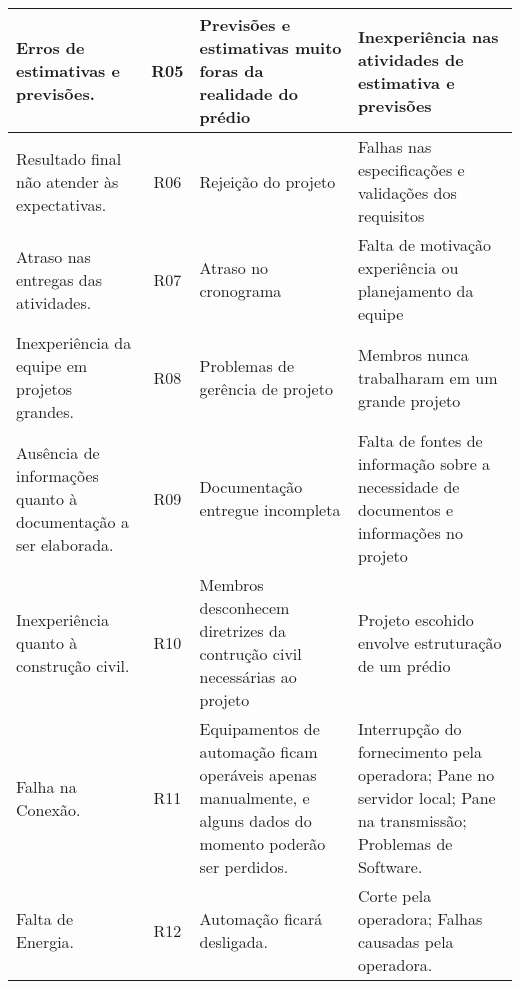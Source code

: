 \begin{table}[!h]
\begin{tabular}{|l|c|l|l|}
    \parbox[t]{5cm}{Erros de estimativas e previsões.}                              & R05                    & \parbox[t]{4cm}{Previsões e estimativas muito foras da realidade do prédio}               & \parbox[t]{4cm}{Inexperiência nas atividades de estimativa e previsões}                                   \\ \hline
    \parbox[t]{5cm}{Resultado final não atender às expectativas.}                   & R06                    & \parbox[t]{4cm}{Rejeição do projeto}                                                      & \parbox[t]{4cm}{Falhas nas especificações e validações dos requisitos}                                    \\ \hline
    \parbox[t]{5cm}{Atraso nas entregas das atividades.}                            & R07                    & \parbox[t]{4cm}{Atraso no cronograma}                                                     & \parbox[t]{4cm}{Falta de motivação experiência ou planejamento da equipe}                                 \\ \hline
    \parbox[t]{5cm}{Inexperiência da equipe em projetos grandes.}                   & R08                    & \parbox[t]{4cm}{Problemas de gerência de projeto}                                         & \parbox[t]{4cm}{Membros nunca trabalharam em um grande projeto}                                           \\ \hline
    \parbox[t]{5cm}{Ausência de informações quanto à documentação a ser elaborada.} & R09                    & \parbox[t]{4cm}{Documentação entregue incompleta}                                         & \parbox[t]{4cm}{Falta de fontes de informação sobre a necessidade de documentos e informações no projeto} \\ \hline
    \parbox[t]{5cm}{Inexperiência quanto à construção civil.}                       & R10                    & \parbox[t]{4cm}{Membros desconhecem diretrizes da contrução civil necessárias ao projeto} & \parbox[t]{4cm}{Projeto escohido envolve estruturação de um prédio}                                       \\ \hline
    \parbox[t]{5cm}{Falha na Conexão.}                       & R11                    & \parbox[t]{4cm}{Equipamentos de automação ficam operáveis apenas manualmente, e alguns dados do momento poderão ser perdidos.} & \parbox[t]{4cm}{Interrupção do fornecimento pela operadora; Pane no servidor local; Pane na transmissão; Problemas de Software.}                                       \\ \hline
    \parbox[t]{5cm}{Falta de Energia.}                       & R12                    & \parbox[t]{4cm}{Automação ficará desligada.} & \parbox[t]{4cm}{Corte pela operadora; Falhas causadas pela operadora.}                                       \\ \hline
  \end{tabular}
\end{table}

